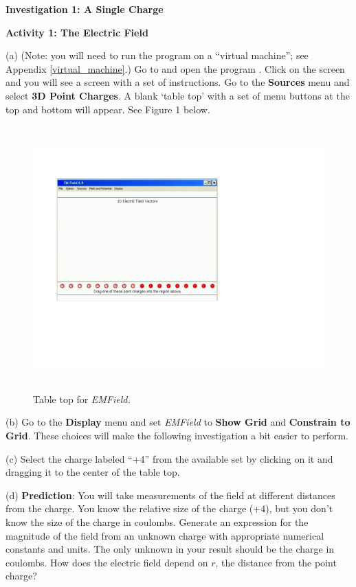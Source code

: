 \textbf{Investigation 1: A Single Charge}

\textbf{Activity 1: The Electric Field}

(a) (Note: you will need to run the program  on a ``virtual machine''; see Appendix \ref{virtual_machine}.)  Go to  and open the program . 
Click on the screen and you will see a screen with a set of
instructions.
Go to the \textbf{Sources} menu and select \textbf{3D Point Charges}.
A blank `table top' with a set of menu 
buttons at the top and bottom will appear. See Figure 1 below.

\begin{figure}[hbt]
\begin{center}
\includegraphics[height=4.0in]{electric_field_and_electric_potential/emfield1c.pdf}
\caption{Table top for {\it EMField.}}
\end{center}
\end{figure}

(b) Go to the {\bf Display} menu and set {\it EMField} to
{\bf Show Grid} and {\bf Constrain to Grid}.
These choices will make the following investigation a bit easier to perform.

(c) Select
the charge labeled {}``+4'' from the available set by clicking
on it and dragging it to the center of the table top. 

(d) \textbf{Prediction}: You will take measurements of the field at different
distances from the charge. You know the relative size of the
charge (+4), but you don't know the size of the charge in coulombs.
Generate an expression for the magnitude of the field from an unknown charge
with appropriate numerical constants and units.
The only unknown in your result should be the charge in coulombs.
How does the electric field depend on $r$, the distance from the point charge?
\newpage


